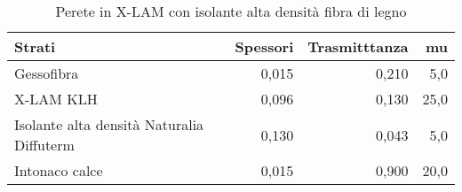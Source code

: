 \begin{table}
\centering
\caption{Perete in X-LAM con isolante alta densità fibra di legno}
\begin{tabular}{lrrr}
\toprule
                                    Strati & Spessori & Trasmitttanza &    mu \\
\midrule
                                Gessofibra &    0,015 &         0,210 &   5,0 \\
                                 X-LAM KLH &    0,096 &         0,130 &  25,0 \\
 Isolante alta densità Naturalia Diffuterm &    0,130 &         0,043 &   5,0 \\
                            Intonaco calce &    0,015 &         0,900 &  20,0 \\
\bottomrule
\end{tabular}
\end{table}

